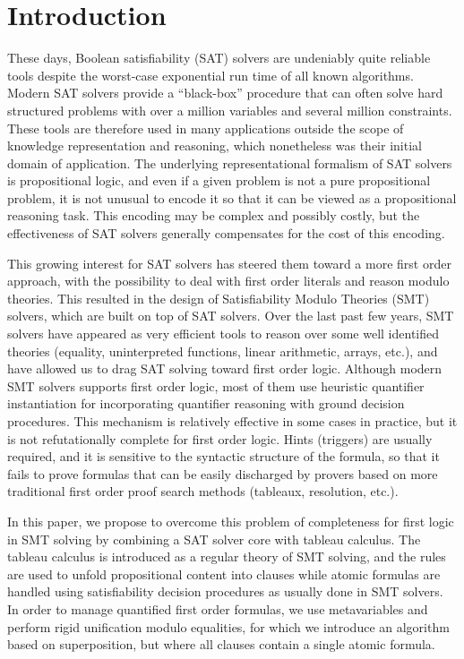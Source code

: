 
\section{Introduction}

These days, Boolean satisfiability (SAT) solvers are undeniably quite reliable
tools despite the worst-case exponential run time of all known
algorithms. Modern SAT solvers provide a ``black-box'' procedure that can often
solve hard structured problems with over a million variables and several million
constraints. These tools are therefore used in many applications outside the
scope of knowledge representation and reasoning, which nonetheless was their
initial domain of application. The underlying representational formalism of SAT
solvers is propositional logic, and even if a given problem is not a pure
propositional problem, it is not unusual to encode it so that it can be viewed
as a propositional reasoning task. This encoding may be complex and possibly
costly, but the effectiveness of SAT solvers generally compensates for the cost
of this encoding.

This growing interest for SAT solvers has steered them toward a more first order
approach, with the possibility to deal with first order literals and reason
modulo theories. This resulted in the design of Satisfiability Modulo Theories
(SMT) solvers, which are built on top of SAT solvers. Over the last past few
years, SMT solvers have appeared as very efficient tools to reason over some
well identified theories (equality, uninterpreted functions, linear arithmetic,
arrays, etc.), and have allowed us to drag SAT solving toward first order logic.
Although modern SMT solvers supports first order logic, most of them use
heuristic quantifier instantiation for incorporating quantifier reasoning with
ground decision procedures. This mechanism is relatively effective in some cases
in practice, but it is not refutationally complete for first order logic. Hints
(triggers) are usually required, and it is sensitive to the syntactic structure
of the formula, so that it fails to prove formulas that can be easily discharged
by provers based on more traditional first order proof search methods (tableaux,
resolution, etc.).

In this paper, we propose to overcome this problem of completeness for first
logic in SMT solving by combining a SAT solver core with tableau calculus. The
tableau calculus is introduced as a regular theory of SMT solving, and the rules
are used to unfold propositional content into clauses while atomic formulas are
handled using satisfiability decision procedures as usually done in SMT solvers.
In order to manage quantified first order formulas, we use metavariables and
perform rigid unification modulo equalities, for which we introduce an algorithm
based on superposition, but where all clauses contain a single atomic formula.

